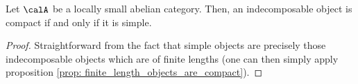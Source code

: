             \begin{proposition} \label{prop: compact_indecomposable_objects_are_simple}
                Let $\calA$ be a locally small abelian category. Then, an indecomposable object is compact if and only if it is simple.
            \end{proposition}
                \begin{proof}
                    Straightforward from the fact that simple objects are precisely those indecomposable objects which are of finite lengths (one can then simply apply proposition \ref{prop: finite_length_objects_are_compact}). 
                \end{proof}